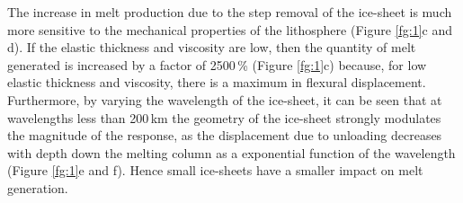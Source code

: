 \documentclass[a4paper,11pt,onecolumn]{article}
\begin{document}
The increase in melt production due to the step removal of the ice-sheet is much more sensitive to the mechanical properties of the lithosphere (Figure \ref{fg:1}c and d). If the elastic thickness and viscosity are low, then the quantity of melt generated is increased by a factor of 2500\,\% (Figure \ref{fg:1}c) because, for low elastic thickness and viscosity, there is a maximum in flexural displacement. Furthermore, by varying the wavelength of the ice-sheet, it can be seen that at wavelengths less than 200\,km the geometry of the ice-sheet strongly modulates the magnitude of the response, as the displacement due to unloading decreases with depth down the melting column as a exponential function of the wavelength (Figure \ref{fg:1}e and f). Hence small ice-sheets have a smaller impact on melt generation.


\end{document}
